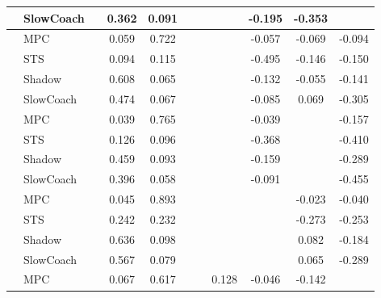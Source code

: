 \begin{tabular}{|l|l|*{9}{c|}}
                                                           & SlowCoach &       &     0.362 &     0.091 &     &     &     &  -0.195 &  -0.353 &       \\
\midrule
[False, True, True, False, False, False, True, True, True] & MPC &       &     0.059 &     0.722 &     &     &     &  -0.057 &  -0.069 &   -0.094 \\
                                                           & STS &       &     0.094 &     0.115 &     &     &     &  -0.495 &  -0.146 &   -0.150 \\
                                                           & Shadow &       &     0.608 &     0.065 &     &     &     &  -0.132 &  -0.055 &   -0.141 \\
                                                           & SlowCoach &       &     0.474 &     0.067 &     &     &     &  -0.085 &   0.069 &   -0.305 \\
\midrule
[False, True, True, False, False, False, True, False, True] & MPC &       &     0.039 &     0.765 &     &     &     &  -0.039 &      &   -0.157 \\
                                                           & STS &       &     0.126 &     0.096 &     &     &     &  -0.368 &      &   -0.410 \\
                                                           & Shadow &       &     0.459 &     0.093 &     &     &     &  -0.159 &      &   -0.289 \\
                                                           & SlowCoach &       &     0.396 &     0.058 &     &     &     &  -0.091 &      &   -0.455 \\
\midrule
[False, True, True, False, False, False, False, True, True] & MPC &       &     0.045 &     0.893 &     &     &     &      &  -0.023 &   -0.040 \\
                                                           & STS &       &     0.242 &     0.232 &     &     &     &      &  -0.273 &   -0.253 \\
                                                           & Shadow &       &     0.636 &     0.098 &     &     &     &      &   0.082 &   -0.184 \\
                                                           & SlowCoach &       &     0.567 &     0.079 &     &     &     &      &   0.065 &   -0.289 \\
\midrule
[False, True, True, False, False, True, True, True, False] & MPC &       &     0.067 &     0.617 &     &     &  0.128 &  -0.046 &  -0.142 &       \\

\end{tabular}
